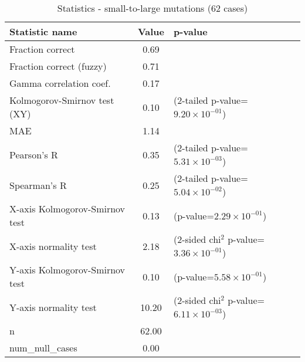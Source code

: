 \documentclass[10pt, letterpaper, oneside, titlepage, landscape]{scrreprt}
\begin{document}
\begin{table}[H]\begin{center}
\begin{tabular}{ l S[table-format=3.2] l}
Statistic name & {Value} & p-value\\
\hline
Fraction correct & 0.69 & \\
Fraction correct (fuzzy) & 0.71 & \\
Gamma correlation coef. & 0.17 & \\
Kolmogorov-Smirnov test (XY) & 0.10 & (2-tailed p-value=$9.20\times10^{-01}$)\\
MAE & 1.14 & \\
Pearson's R & 0.35 & (2-tailed p-value=$5.31\times10^{-03}$)\\
Spearman's R & 0.25 & (2-tailed p-value=$5.04\times10^{-02}$)\\
X-axis Kolmogorov-Smirnov test & 0.13 & (p-value=$2.29\times10^{-01}$)\\
X-axis normality test & 2.18 & (2-sided chi$^{2}$ p-value=$3.36\times10^{-01}$)\\
Y-axis Kolmogorov-Smirnov test & 0.10 & (p-value=$5.58\times10^{-01}$)\\
Y-axis normality test & 10.20 & (2-sided chi$^{2}$ p-value=$6.11\times10^{-03}$)\\
n & 62.00 & \\
num\_null\_cases & 0.00 & \\
\end{tabular}
\caption{Statistics - small-to-large mutations (62 cases)}
\end{center}\end{table}
\end{document}
